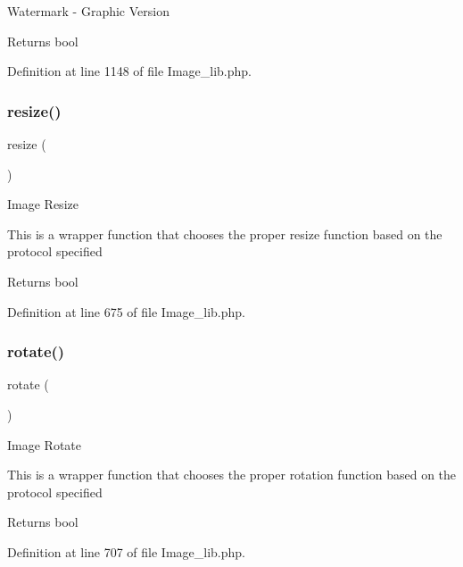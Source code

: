 Watermark -\/ Graphic Version

\begin{DoxyReturn}{Returns}
bool 
\end{DoxyReturn}


Definition at line 1148 of file Image\+\_\+lib.\+php.

\mbox{\label{class_c_i___image__lib_a94e38a7d478ce07200a52c51497e598e}} 
\subsubsection{\texorpdfstring{resize()}{resize()}}
{\footnotesize\ttfamily resize (\begin{DoxyParamCaption}{ }\end{DoxyParamCaption})}

Image Resize

This is a wrapper function that chooses the proper resize function based on the protocol specified

\begin{DoxyReturn}{Returns}
bool 
\end{DoxyReturn}


Definition at line 675 of file Image\+\_\+lib.\+php.

\mbox{\label{class_c_i___image__lib_a74e94d71195d9cbb9c9e3bca3353d912}} 
\subsubsection{\texorpdfstring{rotate()}{rotate()}}
{\footnotesize\ttfamily rotate (\begin{DoxyParamCaption}{ }\end{DoxyParamCaption})}

Image Rotate

This is a wrapper function that chooses the proper rotation function based on the protocol specified

\begin{DoxyReturn}{Returns}
bool 
\end{DoxyReturn}


Definition at line 707 of file Image\+\_\+lib.\+php.

